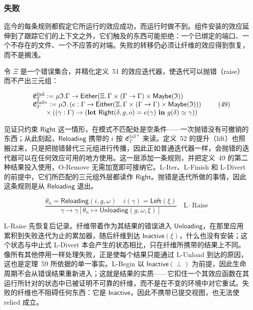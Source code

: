 \documentclass[
  10
]{article}
\begin{document}
\subsubsection{失败} \label{failure}

迄今的每条规则都假定它所运行的效应成功，而运行时做不到。组件安装的效应延伸到了跟踪它们的上下文之外，它们触及的东西可能拒绝：一个已绑定的端口、一个不存在的文件、一个不应答的对端。失败的转移仍必须让纤维的效应得到恢复，而不是搁浅。

令 \(\Xi\) 是一个错误集合，并精化定义~51 的效应迭代器，使迭代可以抛错（raise）而不产出三元组：

\[
\begin{array} { r l } & { \mathfrak { E } _ { \Gamma } ^ { \mathrm { f a i l } } : = \mu \mathfrak { I } . \Gamma \to \mathsf { E i t h e r } ( \Xi , \Gamma \times ( \Gamma \to \Gamma ) \times \mathsf { M a y b e } ( \mathfrak { I } ) ) } \\ & { \mathfrak { E } _ { \Gamma } ^ { \mathrm { f a i l } * } : = \mu \mathfrak { I } . \left( e : \Gamma \to \mathsf { E i t h e r } ( \Xi , \Gamma \times ( \Gamma \to \Gamma ) \times \mathsf { M a y b e } ( \mathfrak { I } ) ) \right) } \\ & { \qquad \times \left( ( \gamma : \Gamma ) \to ( \mathbf { l e t } \ \mathsf { R i g h t } ( \delta , g , o ) = e ( \gamma ) \ \mathbf { i n } \ g ( \delta ) \simeq \gamma ) \right) } \end{array}\tag{49}
\]

见证只约束 \(\mathsf { R i g h t }\) 这一情形，在模式不匹配处是空条件——一次抛错没有可撤销的东西；从此刻起，\(\mathsf { R e l o a d i n g }\) 携带的 \(i\) 按 \(\mathfrak { E } _ { \Gamma } ^ { \mathrm { f a i l } * }\) 来读。定义~52 的提升（lift）也照搬过来，只是把抛错替代三元组进行传播，因此正如普通迭代器一样，会抛错的迭代器可以在任何效应可用的地方使用。这一层添加一条规则，并把定义~49 的第二种结果投入使用，O-Remove 无需加宽即可接纳它。L-Iter、L-Finish 和 L-Divert 的前提中，它们所匹配的三元组外层都读作 \(\mathsf { R i g h t }\)。抛错是迭代所做的事情，因此这条规则是从 \(\mathsf { R e l o a d i n g }\) 退出。

\[
\frac { \theta _ { n } = \mathsf { R e l o a d i n g } ( i , g , \omega ) \quad i ( \gamma ) = \mathsf { L e f t } ( \xi ) } { \gamma \longrightarrow \gamma [ \theta _ { n } \mapsto \mathsf { U n l o a d i n g } ( g , \omega , \xi ) ] } \quad \mathrm { L \cdot R a i s e }
\]

L-Raise 先恢复后记录。纤维带着作为其结果的错误进入 \(\mathsf { U n l o a d i n g }\)，在那里应用累积到失败迭代为止的累加器，随后纤维到达 \(\mathsf { I n a c t i v e } ( \xi )\)，什么也没有安装；这个状态与中止式 L-Divert 本会产生的状态相比，只在纤维所携带的结果上不同。像所有其他停用一样处理失败，正是使每个结果只能通过 L-Unload 到达的原因，这也是定理~59 所依据的单一事实。L-Begin 以 \(\mathsf { I n a c t i v e } ( \perp )\) 为前提，因此生命周期不会从错误结果重新进入；这就是结果的实质——它扣住一个其效应函数在其运行所针对的状态中已被证明不可靠的纤维，而不是在不变的环境中对它重试。失败的纤维也不阻碍任何东西：它是 \(\mathsf { I n a c t i v e }\)，因此不携带已提交视图，也无法使 relied 成立。
\end{document}
